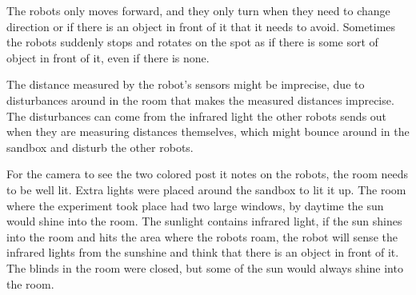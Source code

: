 The robots only moves forward, and they only turn when they need to change direction or if there is an object in front of it that it needs to avoid. Sometimes the robots suddenly stops and rotates on the spot as if there is some sort of object in front of it, even if there is none.

The distance measured by the robot's sensors might be imprecise, due to disturbances around in the room that makes the measured distances imprecise. The disturbances can come from the infrared light the other robots sends out when they are measuring distances themselves, which might bounce around in the sandbox and disturb the other robots. 

For the camera to see the two colored post it notes on the robots, the room needs to be well lit. Extra lights were placed around the sandbox to lit it up. The room where the experiment took place had two large windows, by daytime the sun would shine into the room. The sunlight contains infrared light, if the sun shines into the room and hits the area where the robots roam, the robot will sense the infrared lights from the sunshine and think that there is an object in front of it. The blinds in the room were closed, but some of the sun would always shine into the room.
